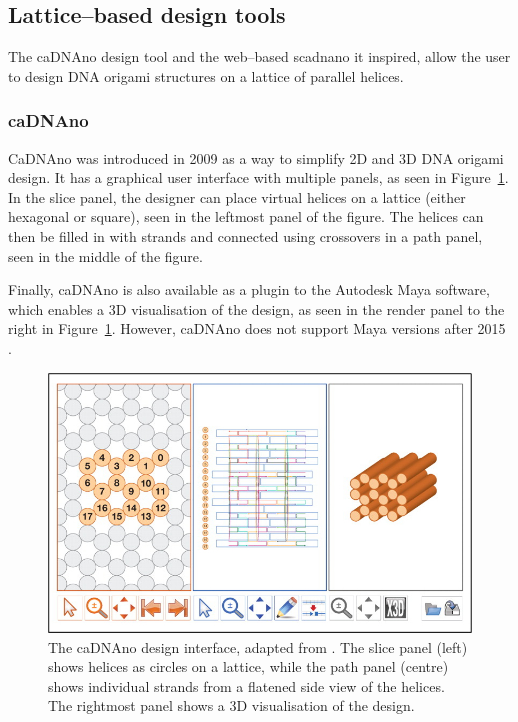 \subsection{Lattice--based design tools}
The caDNAno design tool \cite{cadnano} and the web--based scadnano \cite{scadnano} it inspired, allow the user to design DNA origami structures on a lattice of parallel helices.

\subsubsection{caDNAno}
\label{sec:cadnano}
CaDNAno \cite{cadnano} was introduced in 2009 as a way to simplify 2D and 3D DNA origami design. It has a graphical user interface with multiple panels, as seen in Figure~\ref{fig:cadnano}. In the slice panel, the designer can place virtual helices on a lattice (either hexagonal or square), seen in the leftmost panel of the figure. The helices can then be filled in with strands and connected using crossovers in a path panel, seen in the middle of the figure.

Finally, caDNAno is also available as a plugin to the Autodesk Maya software, which enables a 3D visualisation of the design, as seen in the render panel to the right in Figure~\ref{fig:cadnano}. However, caDNAno does not support Maya versions after 2015 \cite{cadnanoInstall}.

\begin{figure}[ht]
  \begin{center}
    \includegraphics[width=\textwidth]{figures/cadnano.jpeg}
    \caption{The caDNAno design interface, adapted from \cite{cadnano}. The slice panel (left) shows helices as circles on a lattice, while the path panel (centre) shows individual strands from a flatened side view of the helices. The rightmost panel shows a 3D visualisation of the design.}
    \label{fig:cadnano}
  \end{center}
\end{figure}

